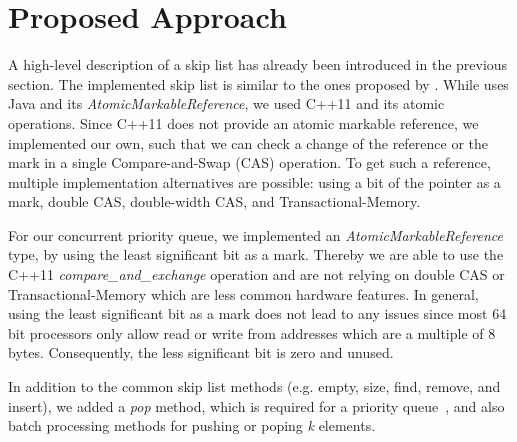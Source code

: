 \section{Proposed Approach}\label{sec:approach}
A high-level description of a skip list has already been introduced in the previous section. The implemented skip list is similar to the ones proposed by \cite{Herlihy:2008:AMP:1734069, Sundell:2005:FLC:1073765.1073770}. While \cite{Herlihy:2008:AMP:1734069} uses Java and its \textit{AtomicMarkableReference}, we used C++11 and its atomic operations. Since C++11 does not provide an atomic markable reference, we implemented our own, such that we can check a change of the reference or the mark in a single Compare-and-Swap (CAS) operation. To get such a reference, multiple implementation alternatives are possible: using a bit of the pointer as a mark, double CAS, double-width CAS, and Transactional-Memory.

For our concurrent priority queue, we implemented an \textit{AtomicMarkableReference} type, by using the least significant bit as a mark. Thereby we are able to use the C++11 {\em compare\_and\_exchange} operation and are not relying on double CAS or Transactional-Memory which are less common hardware features.
In general, using the least significant bit as a mark does not lead to any issues since most 64\,bit processors only allow read or write from addresses which are a multiple of 8\,bytes.
Consequently, the less significant bit is zero and unused.

In addition to the common skip list methods (e.g. empty, size, find, remove, and insert), we added a \textit{pop} method, which is required for a priority queue~\cite{Herlihy:2008:AMP:1734069}, and also batch processing methods for pushing or poping \textit{k} elements.



